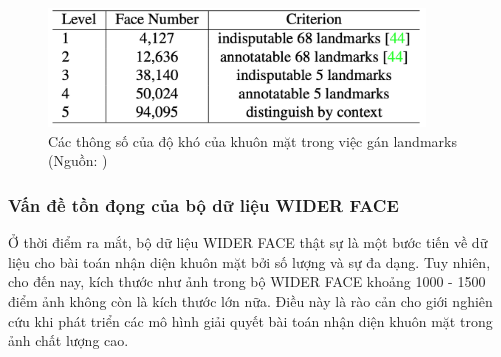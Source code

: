 {    \begin{figure}[H]
        \centering
        \includegraphics[width=10cm] {images/widerface_five_levels_lm_2}
        \caption{Các thông số của độ khó của khuôn mặt trong việc gán landmarks (Nguồn: \cite{deng2020retinaface})}
        \label{fig:widerface_five_levels_lm_2}
    \end{figure}

    \subsubsection*{Vấn đề tồn đọng của bộ dữ liệu WIDER FACE}
    Ở thời điểm ra mắt, bộ dữ liệu WIDER FACE thật sự là một bước tiến về dữ liệu cho bài toán nhận diện khuôn mặt bởi số lượng và sự đa dạng.
    Tuy nhiên, cho đến nay, kích thước như ảnh trong bộ WIDER FACE khoảng 1000 - 1500 điểm ảnh không còn là kích thước lớn nữa.
    Điều này là rào cản cho giới nghiên cứu khi phát triển các mô hình giải quyết bài toán nhận diện khuôn mặt trong ảnh chất lượng cao.
}